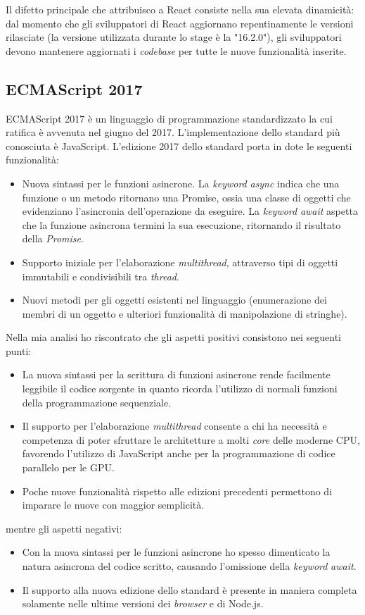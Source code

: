 Il difetto principale che attribuisco a React consiste nella sua elevata dinamicità: dal momento che gli sviluppatori di React aggiornano repentinamente le versioni rilasciate (la versione utilizzata durante lo stage è la "16.2.0"), gli sviluppatori devono mantenere aggiornati i \emph{codebase} per tutte le nuove funzionalità inserite.

\subsection{ECMAScript 2017}

ECMAScript 2017 è un linguaggio di programmazione standardizzato la cui ratifica è avvenuta nel giugno del 2017. L'implementazione dello standard più conosciuta è JavaScript.
L'edizione 2017 dello standard porta in dote le seguenti funzionalità:
\begin{itemize}
	\item Nuova sintassi per le funzioni asincrone. La \emph{keyword} \emph{async} indica che una funzione o un metodo ritornano una Promise, ossia una classe di oggetti che evidenziano l'asincronia dell'operazione da eseguire. La \emph{keyword} \emph{await} aspetta che la funzione asincrona termini la sua esecuzione, ritornando il risultato della \emph{Promise}.
	\item Supporto iniziale per l'elaborazione \emph{multithread}, attraverso tipi di oggetti immutabili e condivisibili tra \emph{thread}.
	\item Nuovi metodi per gli oggetti esistenti nel linguaggio (enumerazione dei membri di un oggetto e ulteriori funzionalità di manipolazione di stringhe).
\end{itemize}

Nella mia analisi ho riscontrato che gli aspetti positivi consistono nei seguenti punti:
\begin{itemize}
	\item La nuova sintassi per la scrittura di funzioni asincrone rende facilmente leggibile il codice sorgente in quanto ricorda l'utilizzo di normali funzioni della programmazione sequenziale.
	\item Il supporto per l'elaborazione \emph{multithread} consente a chi ha necessità e competenza di poter sfruttare le architetture a molti \emph{core} delle moderne \gls{CPU}, favorendo l'utilizzo di JavaScript anche per la programmazione di codice parallelo per le \gls{GPU}.
	\item Poche nuove funzionalità rispetto alle edizioni precedenti permettono di imparare le nuove con maggior semplicità.
\end{itemize}
mentre gli aspetti negativi:
\begin{itemize}
	\item Con la nuova sintassi per le funzioni asincrone ho spesso dimenticato la natura asincrona del codice scritto, causando l'omissione della \emph{keyword} \emph{await}.
	\item Il supporto alla nuova edizione dello standard è presente in maniera completa solamente nelle ultime versioni dei \emph{browser} e di Node.js.\footnotemark
\end{itemize}


